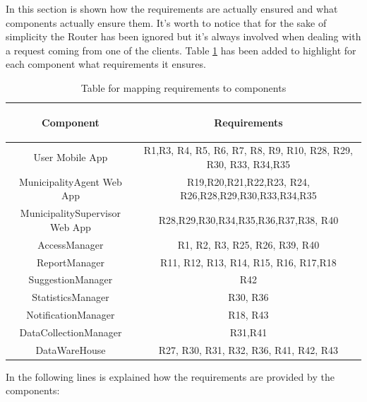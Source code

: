 \documentclass[a4paper]{report}
\begin{document}
In this section is shown how the requirements are actually ensured and what components actually ensure them. It's worth to notice that for the sake of simplicity the Router has been ignored but it's always involved when dealing with a request coming from one of the clients.
Table \ref{tab:req-trace} has been added to highlight for each component what requirements it ensures.
\begin{table}[H]  
  \centering
  \begin{tabular}{|c|c|}
    \cline{1-2}
   	\rule{0pt}{10pt} 
   	\begin{large}
    \textbf{Component} 
    \end{large}&\begin{large}
    \textbf{Requirements} 
    \end{large}\\  \hline
    User Mobile App &  R1,R3, R4, R5, R6, R7, R8, R9, R10, R28, R29, R30, R33, R34,R35\\ \hline
    MunicipalityAgent Web App & R19,R20,R21,R22,R23, R24, R26,R28,R29,R30,R33,R34,R35 \\ \hline
    MunicipalitySupervisor Web App & R28,R29,R30,R34,R35,R36,R37,R38, R40 \\ \hline
    AccessManager & R1, R2, R3, R25, R26, R39, R40 \\ \hline
    ReportManager & R11, R12, R13, R14, R15, R16, R17,R18\\ \hline
    SuggestionManager & R42 \\ \hline
    StatisticsManager & R30, R36 \\ \hline
    NotificationManager & R18, R43 \\ \hline
    DataCollectionManager & R31,R41 \\ \hline
    DataWareHouse & R27, R30, R31, R32, R36, R41, R42, R43 \\ \hline
    
  \end{tabular}
  \caption{Table for mapping requirements to components} \label{tab:req-trace}
\end{table}
In the following lines is explained how the requirements are provided by the components:
\end{document}
